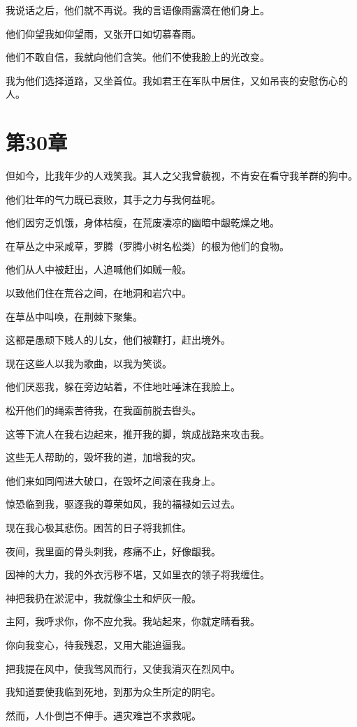 \documentclass[12pt,oneside]{book}
\begin{document}
我说话之后，他们就不再说。我的言语像雨露滴在他们身上。

他们仰望我如仰望雨，又张开口如切慕春雨。

他们不敢自信，我就向他们含笑。他们不使我脸上的光改变。

我为他们选择道路，又坐首位。我如君王在军队中居住，又如吊丧的安慰伤心的人。


\chapter{第30章}
但如今，比我年少的人戏笑我。其人之父我曾藐视，不肯安在看守我羊群的狗中。

他们壮年的气力既已衰败，其手之力与我何益呢。

他们因穷乏饥饿，身体枯瘦，在荒废凄凉的幽暗中龈乾燥之地。

在草丛之中采咸草，罗腾（罗腾小树名松类）的根为他们的食物。

他们从人中被赶出，人追喊他们如贼一般。

以致他们住在荒谷之间，在地洞和岩穴中。

在草丛中叫唤，在荆棘下聚集。

这都是愚顽下贱人的儿女，他们被鞭打，赶出境外。

现在这些人以我为歌曲，以我为笑谈。

他们厌恶我，躲在旁边站着，不住地吐唾沫在我脸上。

松开他们的绳索苦待我，在我面前脱去辔头。

这等下流人在我右边起来，推开我的脚，筑成战路来攻击我。

这些无人帮助的，毁坏我的道，加增我的灾。

他们来如同闯进大破口，在毁坏之间滚在我身上。

惊恐临到我，驱逐我的尊荣如风，我的福禄如云过去。

现在我心极其悲伤。困苦的日子将我抓住。

夜间，我里面的骨头刺我，疼痛不止，好像龈我。

因神的大力，我的外衣污秽不堪，又如里衣的领子将我缠住。

神把我扔在淤泥中，我就像尘土和炉灰一般。

主阿，我呼求你，你不应允我。我站起来，你就定睛看我。

你向我变心，待我残忍，又用大能追逼我。

把我提在风中，使我驾风而行，又使我消灭在烈风中。

我知道要使我临到死地，到那为众生所定的阴宅。

然而，人仆倒岂不伸手。遇灾难岂不求救呢。
\end{document}
